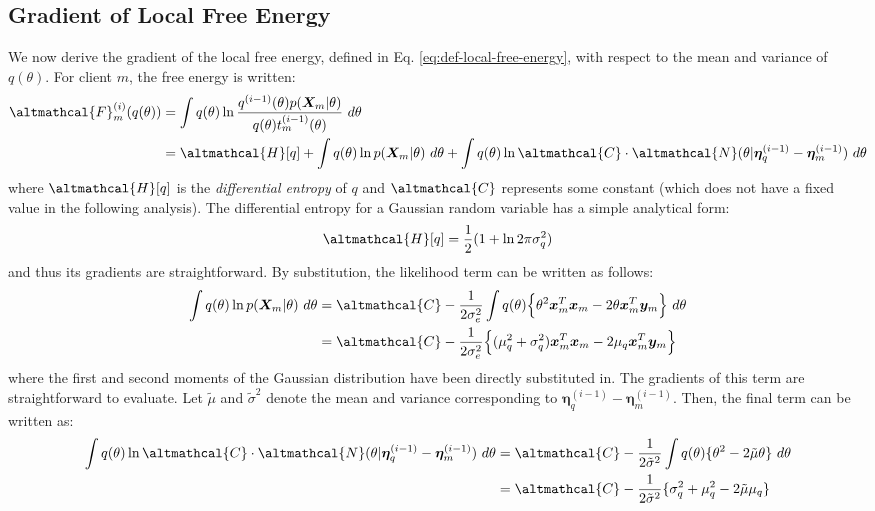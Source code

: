 \subsection{Gradient of Local Free Energy}
We now derive the gradient of the local free energy, defined in Eq. \eqref{eq:def-local-free-energy}, with respect to the mean and variance of $q(\theta)$. For client $m$, the free energy is written:
\begin{align}
\altmathcal{F}_{m}^{(i)}(q(\theta)) &= \int q(\theta) \ln \frac{q^{(i-1)}(\theta) p(\bm{X}_{m}|\theta)}{q(\theta) t_{m}^{(i-1)}(\theta)}\ d\theta \nonumber \\
&= \altmathcal{H}[q] + \int q(\theta) \ln p(\bm{X}_m|\theta)\ d\theta + \int q(\theta) \ln \altmathcal{C} \cdot \altmathcal{N}(\theta| \bm{\eta}_q^{(i-1)} - \bm{\eta}_m^{(i-1)})\ d\theta
\end{align}
where $\altmathcal{H}[q]$ is the \emph{differential entropy} of $q$ and $\altmathcal{C}$ represents some constant (which does not have a fixed value in the following analysis). The differential entropy for a Gaussian random variable has a simple analytical form:
\begin{align}
\altmathcal{H}[q] = \frac{1}{2} (1 + \ln 2\pi \sigma_q^2)
\end{align}
\citep{Bishop:2006} and thus its gradients are straightforward. By substitution, the likelihood term can be written as follows:
\begin{align}
\int q(\theta) \ln p(\bm{X}_m|\theta)\ d\theta &= \altmathcal{C} - \frac{1}{2\sigma_e^2} \int q(\theta) \Big \lbrace \theta^2 \bm{x}_m^T \bm{x}_m - 2\theta \bm{x}_m^T \bm{y}_m \Big \rbrace\ d\theta \nonumber \\ 
&= \altmathcal{C} - \frac{1}{2\sigma_e^2} \Big \lbrace (\mu_q^2 + \sigma_q^2) \bm{x}_m^T \bm{x}_m - 2\mu_q \bm{x}_m^T \bm{y}_m \Big \rbrace\ 
\end{align}
where the first and second moments of the Gaussian distribution have been directly substituted in. The gradients of this term are straightforward to evaluate. Let $\tilde{\mu}$ and $\tilde{\sigma}^2$ denote the mean and variance corresponding to $\bm{\eta}_q^{(i-1)} - \bm{\eta}_m^{(i-1)}$. Then, the final term can be written as:
\begin{align}
\int q(\theta) \ln \altmathcal{C} \cdot \altmathcal{N}(\theta| \bm{\eta}_q^{(i-1)} - \bm{\eta}_m^{(i-1)})\ d\theta &= \altmathcal{C} - \frac{1}{2\tilde{\sigma}^2} \int q(\theta) \lbrace \theta^2 - 2\tilde{\mu}\theta \rbrace\ d\theta \nonumber \\
&= \altmathcal{C} - \frac{1}{2\tilde{\sigma}^2} \lbrace \sigma_q^2 + \mu_q^2 - 2\tilde{\mu} \mu_q \rbrace
\end{align}
